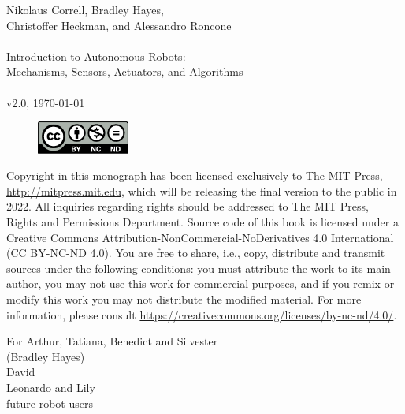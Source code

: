 \documentclass[paper=7in:9in,pagesize=pdftex,11pt,twoside,openright]{scrbook}
\begin{document}


\thispagestyle{empty}
\begin{flushleft}
Nikolaus Correll, Bradley Hayes,\\ Christoffer Heckman, and Alessandro Roncone \\~\\
Introduction to Autonomous Robots:\\ Mechanisms, Sensors, Actuators, and Algorithms\\~\\
v2.0, \today\\
\end{flushleft}

\vfill

\begin{figure}[!h]
\includegraphics[width=1.2in]{figs/by-nc-nd}
\end{figure}

Copyright in this monograph has been licensed exclusively to The MIT Press, \url{http://mitpress.mit.edu}, which will be releasing the final version to the public in 2022. All inquiries regarding rights should be addressed to The MIT Press, Rights and Permissions Department.
Source code of this book is licensed under a Creative Commons Attribution-NonCommercial-NoDerivatives 4.0 International (CC BY-NC-ND 4.0). You are free to share, i.e., copy, distribute and transmit sources under the following conditions: you must attribute the work to its main author, you may not use this work for commercial purposes, and if you remix or modify this work you may not distribute the modified material. For more information, please consult \url{https://creativecommons.org/licenses/by-nc-nd/4.0/}.


\cleardoublepage
\thispagestyle{empty}
\vspace*{\fill}
\begin{center}
For Arthur, Tatiana, Benedict and Silvester\\
(Bradley Hayes)
\\
David
\\
Leonardo and Lily\\
future robot users\\
\end{center}
\vspace*{\fill}
\end{document}

